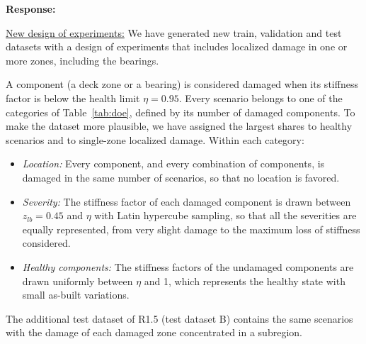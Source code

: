 \documentclass[11pt]{article}
\newenvironment{response}{\par\smallskip\noindent\color{resp}\textbf{Response:}\ }{\par}
\begin{document}
\begin{response}

\underline{New design of experiments:}
We have generated new train, validation and test datasets with a design of experiments that includes localized damage in one or more zones, including the bearings. 

A component (a deck zone or a bearing) is considered damaged when its stiffness factor is below
the health limit $\eta=0.95$. 
Every scenario belongs to one of the categories of Table~\ref{tab:doe}, defined by its number of damaged components. 
To make the dataset more plausible, we have assigned the largest shares to healthy scenarios and to single-zone localized damage.
Within each category:
\begin{itemize}[leftmargin=*]
\item \emph{Location:} Every component, and every combination of components, is damaged in the same number of scenarios, so that no location is favored.
\item \emph{Severity:} The stiffness factor of each damaged component is drawn between $z_{lb}=0.45$ and $\eta$ with Latin hypercube sampling, so that all the severities are equally represented, from very slight damage to the maximum loss of stiffness considered.
\item \emph{Healthy components:} The stiffness factors of the undamaged components are drawn uniformly between $\eta$
and 1, which represents the healthy state with small as-built variations.
\end{itemize}
The additional test dataset of R1.5 (test dataset B) contains the same scenarios with the damage of each damaged zone concentrated in a subregion. 


\end{response}
\end{document}
